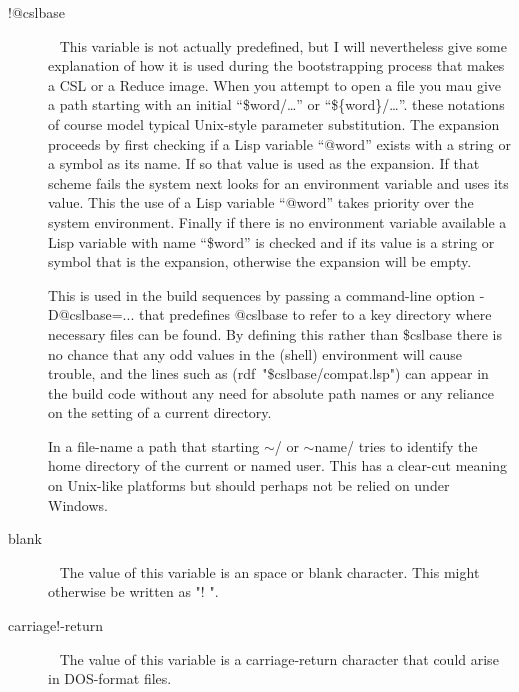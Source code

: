 \documentclass[a4paper,11pt]{article}
\begin{document}
\begin{description}
\item [{\ttfamily !@cslbase}]  ~\newline
This variable is not actually predefined, but I will nevertheless give some
explanation of how it is used during the bootstrapping process that makes
a CSL or a Reduce image. When you attempt to open a file you mau give
a path starting with an initial ``\$word/\ldots'' or ``\$\{word\}/\ldots''.
these notations of course model typical Unix-style parameter substitution.
The expansion proceeds by first checking if a Lisp variable ``@word''
exists with a string or a symbol as its name. If so that value is used
as the expansion. If that scheme fails the system next looks for an
environment variable and uses its value. This the use of a Lisp variable
``@word'' takes priority over the system environment. Finally if there is
no environment variable available a Lisp variable with name ``\$word'' is
checked and if its value is a string or symbol that is the expansion,
otherwise the expansion will be empty.
  
This is used in the build sequences by passing a command-line
option {\ttfamily -D@cslbase=...} that predefines
{\ttfamily @cslbase} to refer to a key directory where necessary files
can be found.
By defining this rather than {\ttfamily \$cslbase} there is no chance that
any odd values in the (shell) environment will cause trouble, and the
lines such as {\ttfamily (rdf~"\$cslbase/compat.lsp")} can appear in the build
code without any need for absolute path names or any
reliance on the setting of a current directory.
  
In a file-name a path that starting {\ttfamily $\sim$/} or
{\ttfamily $\sim$name/} tries to identify the home directory of the
current or named user. This has a clear-cut meaning on Unix-like
platforms but should perhaps not be relied on under Windows.

\item [{\ttfamily blank}]  ~\newline
The value of this variable is an space or blank character. This
might otherwise be written as {\ttfamily "! "}.

\item [{\ttfamily carriage!-return}]  ~\newline
The value of this variable is a carriage-return character that could arise
in DOS-format files.


\end{description}
\end{document}
